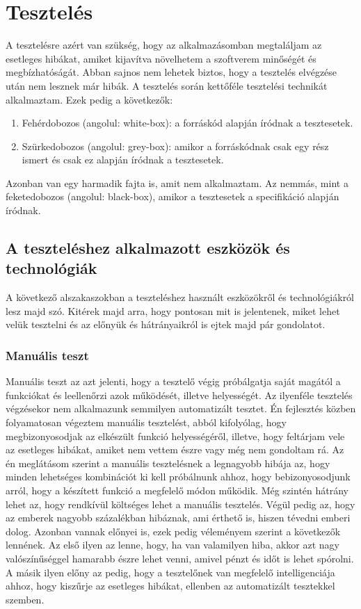 \documentclass[]{thesis-ekf}
\theoremstyle{definition}
\theoremstyle{remark}
\begin{document}
	\chapter{Tesztelés}
		A tesztelésre azért van szükség, hogy az alkalmazásomban megtaláljam az esetleges hibákat, amiket kijavítva növelhetem a szoftverem minőségét és megbízhatóságát. Abban sajnos nem lehetek biztos, hogy a tesztelés elvégzése után nem lesznek már hibák. A tesztelés során kettőféle tesztelési technikát alkalmaztam. Ezek pedig a következők:
		\begin{enumerate}
			\item Fehérdobozos (angolul: white-box): a forráskód alapján íródnak a tesztesetek.
			\item Szürkedobozos (angolul: grey-box): amikor a forráskódnak csak egy rész ismert és csak ez alapján íródnak a tesztesetek.
		\end{enumerate}
		Azonban van egy harmadik fajta is, amit nem alkalmaztam. Az nemmás, mint a feketedobozos (angolul: black-box), amikor a tesztesetek a specifikáció alapján íródnak.
		\cite[26-29.~oldal]{Kusper}
	\section{A teszteléshez alkalmazott eszközök és technológiák}
			A következő alszakaszokban a teszteléshez használt eszközökről és technológiákról lesz majd szó. Kitérek majd arra, hogy pontosan mit is jelentenek, miket lehet velük tesztelni és az előnyük és hátrányaikról is ejtek majd pár gondolatot.
	\subsection{Manuális teszt}
		Manuális teszt az azt jelenti, hogy a tesztelő végig próbálgatja saját magától a funkciókat és leellenőrzi azok működését, illetve helyességét. Az ilyenféle tesztelés végzésekor nem alkalmazunk semmilyen automatizált tesztet. Én fejlesztés közben folyamatosan végeztem manuális tesztelést, abból kifolyólag, hogy megbizonyosodjak az elkészült funkció helyességéről, illetve, hogy feltárjam vele az esetleges hibákat, amiket nem vettem észre vagy még nem gondoltam rá. Az én meglátásom szerint a manuális tesztelésnek a legnagyobb hibája az, hogy minden lehetséges kombinációt ki kell próbálnunk ahhoz, hogy bebizonyosodjunk arról, hogy a készített funkció a megfelelő módon működik. Még szintén hátrány lehet az, hogy rendkívül költséges lehet a manuális tesztelés. Végül pedig az, hogy az emberek nagyobb százalékban hibáznak, ami érthető is, hiszen tévedni emberi dolog. Azonban vannak előnyei is, ezek pedig véleményem szerint a következők lennének. Az első ilyen az lenne, hogy, ha van valamilyen hiba, akkor azt nagy valószínűséggel hamarabb észre lehet venni, amivel pénzt és időt is lehet spórolni. A másik ilyen előny az pedig, hogy a tesztelőnek van megfelelő intelligenciája ahhoz, hogy kiszűrje az esetleges hibákat, ellenben az automatizált tesztekkel szemben. 
		
\end{document}
